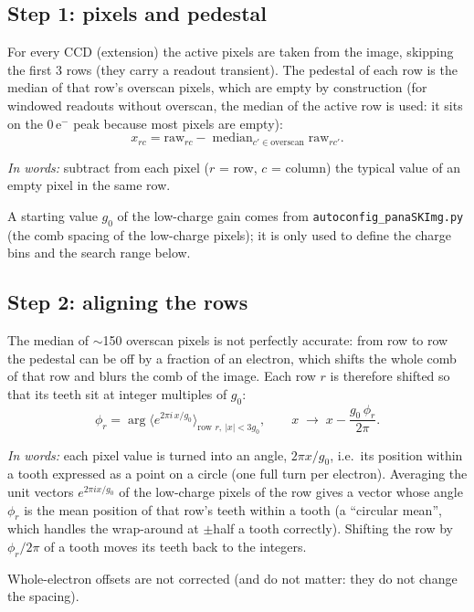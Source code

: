 \documentclass[11pt,a4paper]{article}
\newcommand{\code}[1]{\texttt{#1}}
\newcommand{\eminus}{e$^-$}
\newcommand{\inwords}[1]{\par\noindent\textit{In words:} #1\par}
\begin{document}
\subsection{Step 1: pixels and pedestal}
For every CCD (extension) the active pixels are taken from the image, skipping the first 3 rows
(they carry a readout transient). The pedestal of each row is the median of that row's overscan
pixels, which are empty by construction (for windowed readouts without overscan, the median of the
active row is used: it sits on the 0\,\eminus{} peak because most pixels are empty):
\begin{equation}
x_{rc} = \mathrm{raw}_{rc} - \operatorname{median}_{c' \in \text{overscan}} \mathrm{raw}_{rc'} .
\end{equation}
\inwords{subtract from each pixel ($r$ = row, $c$ = column) the typical value of an empty pixel in the
same row.} A starting value $g_0$ of the low-charge gain comes from \code{autoconfig\_panaSKImg.py}
(the comb spacing of the low-charge pixels); it is only used to define the charge bins and the search
range below.

\subsection{Step 2: aligning the rows}
The median of $\sim$150 overscan pixels is not perfectly accurate: from row to row the pedestal can be
off by a fraction of an electron, which shifts the whole comb of that row and blurs the comb of the
image. Each row $r$ is therefore shifted so that its teeth sit at integer multiples of $g_0$:
\begin{equation}
\phi_r = \arg \Big\langle e^{2\pi i\,x/g_0} \Big\rangle_{\text{row } r,\ |x|<3g_0}, \qquad
x \;\to\; x - \frac{g_0\,\phi_r}{2\pi} .
\label{eq:align}
\end{equation}
\inwords{each pixel value is turned into an angle, $2\pi x/g_0$, i.e.\ its position within a tooth
expressed as a point on a circle (one full turn per electron). Averaging the unit vectors
$e^{2\pi i x/g_0}$ of the low-charge pixels of the row gives a vector whose angle $\phi_r$ is the mean
position of that row's teeth within a tooth (a ``circular mean'', which handles the wrap-around at
$\pm$half a tooth correctly). Shifting the row by $\phi_r/2\pi$ of a tooth moves its teeth back to
the integers.} Whole-electron offsets are not corrected (and do not matter: they do not change the
spacing).
\end{document}
